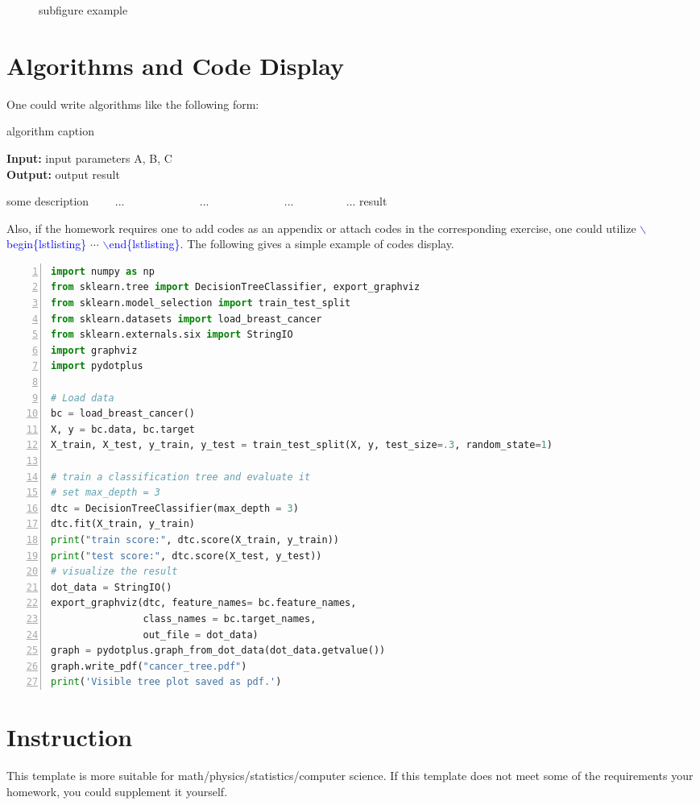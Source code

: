 \documentclass[12pt]{article}
\newcommand{\simarab}{\fontspec{Courier New}}
\begin{document}
\begin{figure}[h]
  \centering%
  \hspace{4em}%
  \caption{subfigure example}
  \label{fig:subfigure}
\end{figure}

\section{\bfseries Algorithms and Code Display}
 \label{sec:algcode}
One could write algorithms like the following form:

\begin{algorithm}[H]
\caption{algorithm caption} %
\hspace*{0.02in} {\bf Input:} %
input parameters A, B, C\\
\hspace*{0.02in} {\bf Output:} %
output result
\begin{algorithmic}[1]
\State some description %
　　\State ...
　　　　\State ...
　　\Else
　　　　\State ...
　　\EndIf
\EndFor
{} %
　　\State ...
\EndWhile
\State \Return result
\end{algorithmic}
\end{algorithm}

Also, if the homework requires one to add codes as an appendix or attach codes in the corresponding exercise, one could utilize \textcolor{blue}{\simarab $\backslash$begin\{lstlisting\}} $\cdots$ \textcolor{blue}{\simarab $\backslash$end\{lstlisting\}}. The following gives a simple example of codes display.
\begin{lstlisting}[language=python, numbers=left]
import numpy as np
from sklearn.tree import DecisionTreeClassifier, export_graphviz
from sklearn.model_selection import train_test_split
from sklearn.datasets import load_breast_cancer
from sklearn.externals.six import StringIO
import graphviz
import pydotplus

# Load data
bc = load_breast_cancer()
X, y = bc.data, bc.target
X_train, X_test, y_train, y_test = train_test_split(X, y, test_size=.3, random_state=1)

# train a classification tree and evaluate it
# set max_depth = 3
dtc = DecisionTreeClassifier(max_depth = 3)
dtc.fit(X_train, y_train)
print("train score:", dtc.score(X_train, y_train))
print("test score:", dtc.score(X_test, y_test))
# visualize the result
dot_data = StringIO()
export_graphviz(dtc, feature_names= bc.feature_names, 
                class_names = bc.target_names,
                out_file = dot_data)
graph = pydotplus.graph_from_dot_data(dot_data.getvalue())
graph.write_pdf("cancer_tree.pdf")
print('Visible tree plot saved as pdf.')
\end{lstlisting}

\section{\bfseries Instruction}
This template is more suitable for math/physics/statistics/computer science. If this template does not meet some of the requirements your homework, you could supplement it yourself.
 
\end{document}
